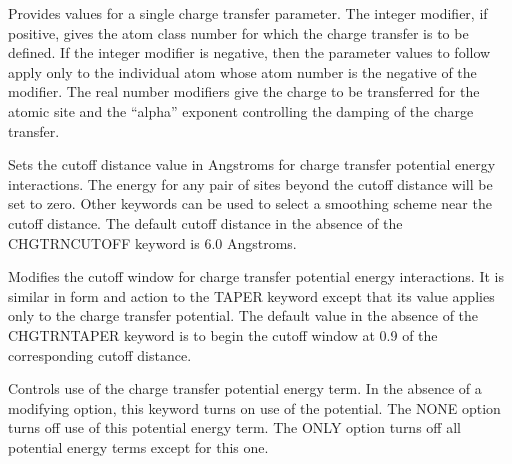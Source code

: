 \documentclass[letterpaper,11pt,english]{sphinxmanual}
\begin{document}
\ignorespaces {}\label{\detokenize{text/keywords:key-chgtrn}}\begin{description}
\sphinxAtStartPar
Provides values for a single charge transfer parameter. The integer modifier, if positive, gives the atom class number for which the charge transfer is to be defined. If the integer modifier is negative, then the parameter values to follow apply only to the individual atom whose atom number is the negative of the modifier. The real number modifiers give the charge to be transferred for the atomic site and the “alpha” exponent controlling the damping of the charge transfer.

\end{description}

\ignorespaces {}\label{\detokenize{text/keywords:key-chgtrn-cutoff}}\begin{description}
\sphinxAtStartPar
Sets the cutoff distance value in Angstroms for charge transfer potential energy interactions. The energy for any pair of sites beyond the cutoff distance will be set to zero. Other keywords can be used to select a smoothing scheme near the cutoff distance. The default cutoff distance in the absence of the CHGTRN\sphinxhyphen{}CUTOFF keyword is 6.0 Angstroms.

\end{description}

\ignorespaces {}\label{\detokenize{text/keywords:key-chgtrn-taper}}\begin{description}
\sphinxAtStartPar
Modifies the cutoff window for charge transfer potential energy interactions. It is similar in form and action to the TAPER keyword except that its value applies only to the charge transfer potential. The default value in the absence of the CHGTRN\sphinxhyphen{}TAPER keyword is to begin the cutoff window at 0.9 of the corresponding cutoff distance.

\end{description}

\ignorespaces {}\label{\detokenize{text/keywords:key-chgtrnterm}}\begin{description}
\sphinxAtStartPar
Controls use of the charge transfer potential energy term. In the absence of a modifying option, this keyword turns on use of the potential. The NONE option turns off use of this potential energy term. The ONLY option turns off all potential energy terms except for this one.

\end{description}
\end{document}
